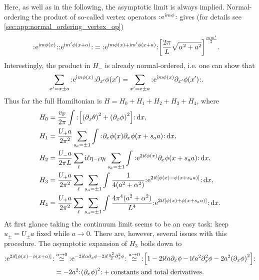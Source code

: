 Here, as well as in the following, the asymptotic limit is always implied.
Normal-ordering the product of so-called vertex operators $\normord{\powe{\i m\phi}}$ gives (for details see \autoref{sec:app:normal_ordering_vertex_op})
\begin{align*}
\normord{\powe{\i m\phi(x)}} \normord{\powe{\i m'\phi(x+a)}} &= \normord{\powe{\i m\phi(x) + \i m'\phi(x+a)}} \klb*{\frac{2\pi}{L} \sqrt{\alpha^2+a^2} }^{\frac{mm'}{2}}.
\end{align*}
Interestingly, the product in $H_-$ is already normal-ordered, i.e. one can show that
\begin{align*}
\sum_{x'=x\pm a} \normord{\powe{\i m\phi(x)}} \partial_{x'} \phi(x') &= \sum_{x'=x\pm a} \normord{\powe{\i m\phi(x)}\partial_{x'}\phi(x')}.
\end{align*}
Thus far the full Hamiltonian is $H=H_0 + H_1 + H_2 + H_3 + H_4$, where
\begin{align*}
H_0 &= \frac{\vf}{2\pi} \intx{ }{ }{\normord{\klb*{\kla*{\partial_x\theta}^2 + \kla*{\partial_x\phi}^2}}}{x},\\
H_1 &= \frac{U_+a}{2\pi^2} \sum_{s_a=\pm 1} \intx{ }{ }{\normord{\partial_x\phi(x) \partial_x\phi(x+s_aa)}}{x},\\
H_2 &= \frac{U_-a}{2\pi L} \sum_\ell \i\ell \eta_{-\ell} \eta_\ell \sum_{s_a=\pm 1} \intx{ }{ }{\normord{\powe{2\i\ell\phi(x)} \partial_x\phi(x+s_aa)}}{x},\\
H_3 &= \frac{U_+a}{2\pi^2} \sum_{\ell} \sum_{s_a=\pm 1} \intx{ }{ }{\frac{1}{4(a^2+\alpha^2)}\normord{\powe{2\i\ell\klb*{\phi(x) - \phi(x+s_aa)}}}}{x},\\
H_4 &= \frac{U_+a}{2\pi^2} \sum_{\ell} \sum_{s_a=\pm 1} \intx{ }{ }{\frac{4\pi^4(a^2+\alpha^2)}{L^4} \normord{\powe{2\i\ell\klb*{\phi(x) + \phi(x+s_aa)}}}}{x}.
\end{align*}
At first glance taking the continuum limit seems to be an easy task: keep $u_\pm = U_\pm a$ fixed while $a\rightarrow 0$.
There are, however, several issues with this procedure.
The asymptotic expansion of $H_3$ boils down to
\begin{align*}
\normord{\powe{2\i\ell \klb*{\phi(x) - \phi(x+a)}}} &\asymeq{a\rightarrow 0} \normord{\powe{-2\i\ell a\partial_x\phi - 2\i\ell \frac{a^2}{2} \partial_x^2\phi}} \asymeq{a\rightarrow 0} \normord{\klb*{1 - 2\i\ell a\partial_x\phi - \i\ell a^2\partial_x^2\phi - 2a^2 \kla*{\partial_x\phi}^2}} \\
&= - 2a^2 \normord{\kla*{\partial_x\phi}^2} + \text{constants and total derivatives}.
\end{align*}
